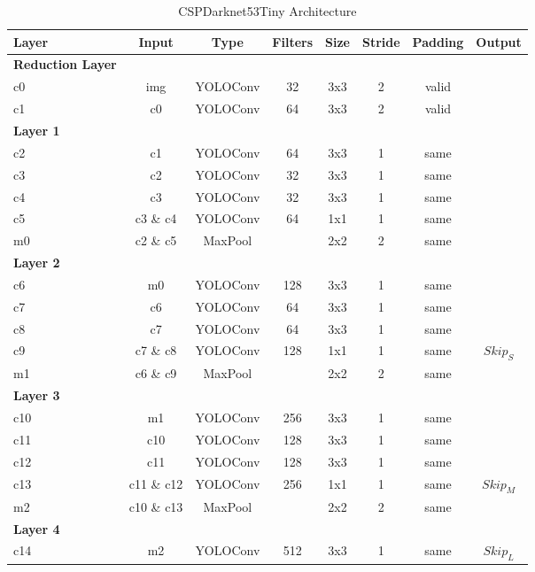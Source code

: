 \begin{table}
\begin{center}

\begin{tabular}{l|c|c|c|c|c|c|c}
    \textbf{Layer} & \textbf{Input} & \textbf{Type} & \textbf{Filters} & \textbf{Size} & \textbf{Stride} & \textbf{Padding} & \textbf{Output} \\
    \hline
    \textbf{Reduction Layer} & & & & & &\\
    c0 & img & YOLOConv & 32 & 3x3 & 2 & valid\\
    c1 & c0 & YOLOConv & 64 & 3x3 & 2 & valid\\
    \textbf{Layer 1} & & & & & &\\
    c2 & c1 & YOLOConv & 64 & 3x3 & 1 & same\\
    c3 & c2 & YOLOConv & 32 & 3x3 & 1 & same\\
    c4 & c3 & YOLOConv & 32 & 3x3 & 1 & same\\
    c5 & c3 \& c4 & YOLOConv & 64 & 1x1 & 1 & same\\
    m0 & c2 \& c5 & MaxPool &  & 2x2 & 2 & same\\
    \textbf{Layer 2} & & & & & &\\
    c6 & m0 & YOLOConv & 128 & 3x3 & 1 & same\\
    c7 & c6 & YOLOConv & 64 & 3x3 & 1 & same\\
    c8 & c7 & YOLOConv & 64 & 3x3 & 1 & same\\
    c9 & c7 \& c8 & YOLOConv & 128 & 1x1 & 1 & same & $Skip_S$\\
    m1 & c6 \& c9 & MaxPool & & 2x2  & 2 & same\\
    \textbf{Layer 3} & & & & & &\\
    c10 & m1 & YOLOConv & 256 & 3x3 & 1 & same\\
    c11 & c10 & YOLOConv & 128 & 3x3 & 1 & same\\
    c12 & c11 & YOLOConv & 128 & 3x3 & 1 & same\\
    c13 & c11 \& c12 & YOLOConv &  256 & 1x1 & 1 & same & $Skip_M$\\
    m2 & c10 \& c13 & MaxPool & & 2x2 & 2 & same\\
    \textbf{Layer 4} & & & & & &\\
    c14 & m2 & YOLOConv & 512 & 3x3 & 1 & same & $Skip_L$\\
\end{tabular}

\caption{CSPDarknet53Tiny Architecture}
\label{tab:darknet_tiny_arch}
\end{center}
\end{table}

